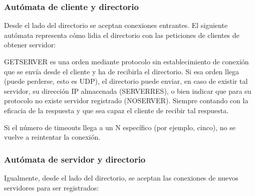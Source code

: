 \documentclass{article}
\begin{document}
\subsubsection{Autómata de cliente y directorio}

Desde el lado del directorio se aceptan conexiones entrantes. El siguiente autómata representa cómo lidia el directorio con las peticiones de clientes de obtener servidor:


GETSERVER es una orden mediante protocolo sin establecimiento de conexión que se envía desde el cliente y ha de recibirla el directorio. Si esa orden llega (puede perderse, esto es UDP), el directorio puede enviar, en caso de existir tal servidor, su dirección IP almacenada (SERVERRES), o bien indicar que para su protocolo no existe servidor registrado (NOSERVER). Siempre contando con la eficacia de la respuesta y que sea capaz el cliente de recibir tal respuesta.

Si el número de timeouts llega a un N específico (por ejemplo, cinco), no se vuelve a reintentar la conexión.


\subsubsection{Autómata de servidor y directorio}

Igualmente, desde el lado del directorio, se aceptan las conexiones de nuevos servidores para ser registrados:
\end{document}

